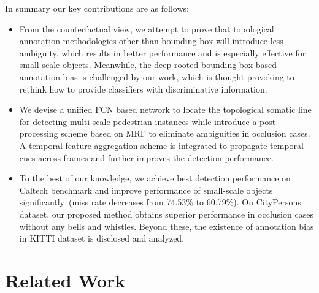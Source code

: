 \documentclass[runningheads]{llncs}
\begin{document}
In summary our key contributions are as follows:
\begin{itemize}
	\item From the counterfactual view, we attempt to prove that topological annotation methodologies other than bounding box will introduce less ambiguity, which results in better performance and is especially effective for small-scale objects. Meanwhile, the deep-rooted bounding-box based annotation bias is challenged by our work, which is thought-provoking to rethink how to provide classifiers with discriminative information.
	\item We devise a unified FCN based network to locate the topological somatic line for detecting multi-scale pedestrian instances while introduce a post-processing scheme based on MRF to eliminate ambiguities in occlusion cases. A temporal feature aggregation scheme is integrated to propagate temporal cues across frames and further improves the detection performance.
	\item To the best of our knowledge, we achieve best detection performance on Caltech benchmark and improve performance of small-scale objects significantly~(miss rate decreases from 74.53\% to 60.79\%). On CityPersons dataset, our proposed method obtains superior performance in occlusion cases without any bells and whistles. Beyond these, the existence of annotation bias in KITTI dataset is disclosed and analyzed.
\end{itemize}

\section{Related Work}
\end{document}
